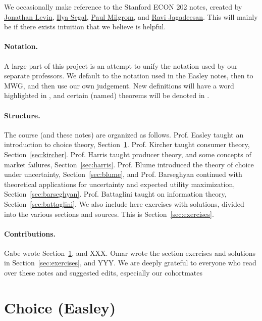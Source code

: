 \documentclass[12pt]{article}
\begin{document}
We occasionally make reference to the Stanford ECON 202 notes, created by \href{https://www.gsb.stanford.edu/faculty-research/faculty/jonathan-levin}{Jonathan Levin}, \href{https://web.stanford.edu/~isegal/}{Ilya Segal}, \href{https://milgrom.people.stanford.edu/}{Paul Milgrom}, and \href{https://sites.google.com/site/ravijagadeesan/}{Ravi Jagadeesan}. This will mainly be if there exists intuition that we believe is helpful.

\paragraph{Notation.} A large part of this project is an attempt to unify the notation used by our separate professors. We default to the notation used in the Easley notes, then to MWG, and then use our own judgement. New definitions will have a word highlighted in , and certain (named) theorems will be denoted in . 

\paragraph{Structure.} The course (and these notes) are organized as follows. Prof. Easley taught an introduction to choice theory, Section~\ref{sec:easley}. Prof. Kircher taught consumer theory, Section~\ref{sec:kircher}. Prof. Harris taught producer theory, and some concepts of market failures, Section~\ref{sec:harris}. Prof. Blume introduced the theory of choice under uncertainty, Section~\ref{sec:blume}, and Prof. Barseghyan continued with theoretical applications for uncertainty and expected utility maximization, Section~\ref{sec:barseghyan}. Prof. Battaglini taught on information theory, Section~\ref{sec:battaglini}. We also include here exercises with solutions, divided into the various sections and sources. This is Section~\ref{sec:exercises}.

\paragraph{Contributions.} Gabe wrote Section~\ref{sec:easley}, and XXX. Omar wrote the section exercises and solutions in Section~\ref{sec:exercises}, and YYY. We are deeply grateful to everyone who read over these notes and suggested edits, especially our cohortmates 


\newpage
\section{Choice (Easley)}\label{sec:easley}
\end{document}
